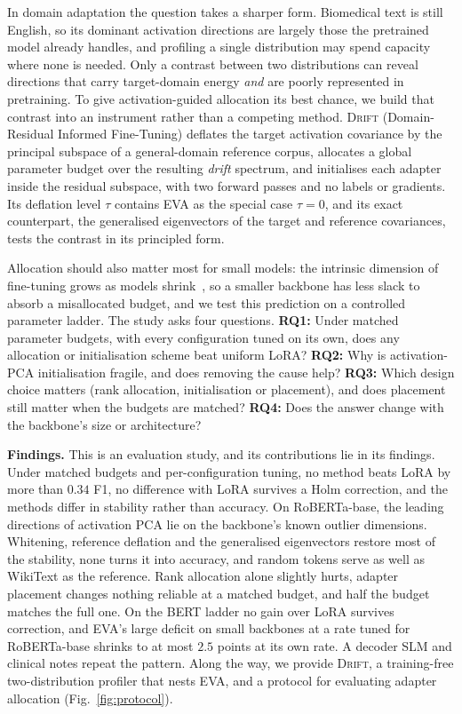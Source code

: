 \documentclass[conference]{IEEEtran}
\newcommand{\method}{\textsc{Drift}}
\begin{document}
In domain adaptation the question takes a sharper form. Biomedical text is still
English, so its dominant activation directions are largely those the pretrained
model already handles, and profiling a single distribution may spend capacity
where none is needed. Only a contrast between two distributions can reveal
directions that carry target-domain energy \emph{and} are poorly represented in
pretraining. To give activation-guided allocation its best chance, we build that
contrast into an instrument rather than a competing method. \method{}
(Domain-Residual Informed Fine-Tuning) deflates the target activation covariance
by the principal subspace of a general-domain reference corpus, allocates a
global parameter budget over the resulting \emph{drift} spectrum, and initialises
each adapter inside the residual subspace, with two forward passes and no labels
or gradients. Its deflation level $\tau$ contains EVA as the special case
$\tau = 0$, and its exact counterpart, the generalised eigenvectors of the target
and reference covariances, tests the contrast in its principled form.

Allocation should also matter most for small models: the intrinsic dimension of
fine-tuning grows as models shrink~\cite{aghajanyan2021intrinsic}, so a smaller
backbone has less slack to absorb a misallocated budget, and we test this
prediction on a controlled parameter ladder. The study asks four questions.
\textbf{RQ1:} Under matched parameter budgets, with every configuration tuned on
its own, does any allocation or initialisation scheme beat uniform LoRA?
\textbf{RQ2:} Why is activation-PCA initialisation fragile, and does removing
the cause help? \textbf{RQ3:} Which design choice matters (rank allocation,
initialisation or placement), and does placement still matter when the budgets
are matched? \textbf{RQ4:} Does the answer change with the backbone's size or
architecture?

\noindent\textbf{Findings.} This is an evaluation study, and its contributions
lie in its findings. Under matched budgets and per-configuration tuning, no
method beats LoRA by more than $0.34$ F1, no difference with LoRA survives a Holm
correction, and the methods differ in stability rather than accuracy. On
RoBERTa-base, the leading directions of activation PCA lie on the backbone's
known outlier dimensions. Whitening, reference deflation and the generalised
eigenvectors restore most of the stability, none turns it into accuracy, and
random tokens serve as well as WikiText as the reference. Rank allocation alone
slightly hurts, adapter placement changes nothing reliable at a matched budget,
and half the budget matches the full one. On the BERT ladder no gain over LoRA
survives correction, and EVA's large deficit on small backbones at a rate tuned
for RoBERTa-base shrinks to at most $2.5$ points at its own rate. A decoder SLM
and clinical notes repeat the pattern. Along the way, we provide \method{}, a
training-free two-distribution profiler that nests EVA, and a protocol for
evaluating adapter allocation (Fig.~\ref{fig:protocol}).
\end{document}
